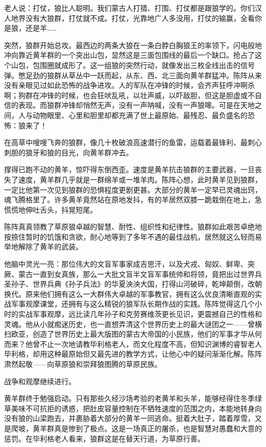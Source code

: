\par 老人说：打仗，狼比人聪明。我们蒙古人打猎、打围、打仗都是跟狼学的。你们汉人地界没有大狼群，打仗就不成。打仗，光靠地广人多没用，打仗的输赢，全看你是狼，还是羊……
\par 突然，狼群开始总攻。最西边的两条大狼在一条白脖白胸狼王的率领下，闪电般地冲向靠近黄羊群的一个突出山包，显然这是三面包围线的最后一个缺口。抢占了这个山包，包围圈就成形了。这一组狼的突然行动，就像发出三枚全线出击的信号弹。憋足劲的狼群从草丛中一跃而起，从东、西、北三面向黄羊群猛冲。陈阵从来没有亲眼见过如此恐怖的战争进攻。人的军队在冲锋的时候，会齐声狂呼冲啊杀啊；狗群在冲锋的时候，也会狂吠乱吼，以壮声威，以吓敌胆，但这是胆虚或不自信的表现。而狼群冲锋却悄然无声，没有一声呐喊，没有一声狼嗥。可是在天地之间，人与动物眼里、心里和胆里却都充满了世上最原始、最残忍、最负盛名的恐怖：狼来了！
\par 在高草中嗖嗖飞奔的狼群，像几十枚破浪高速潜行的鱼雷，运载着最锋利、最刺心刺胆的狼牙和狼的目光，向黄羊群冲去。
\par 撑得已跑不动的黄羊，惊吓得东倒西歪。速度是黄羊抗击狼群的主要武器，一旦丧失了速度，黄羊群几乎就是一群绵羊或一堆羊肉。陈阵心想，此时黄羊见到狼群，一定比他第一次见到狼群的恐惧程度更剧更甚。大部分的黄羊一定早已灵魂出窍，魂飞腾格里了。许多黄羊竟然站在原地发抖，有的羊居然双膝一跪栽倒在地上，急慌慌地伸吐舌头，抖晃短尾。
\par 陈阵真真领教了草原狼卓越的智慧、耐性、组织性和纪律性。狼群如此艰苦卓绝地按捺住暂时的饥饿和贪欲，耐心地等到了多年不遇的最佳战机，居然就这么轻而易举地解除了黄羊的武装。
\par 他脑中灵光一亮：那位伟大的文盲军事家成吉思汗，以及犬戎、匈奴、鲜卑、突厥、蒙古一直到女真族，那么一大批文盲半文盲军事统帅和将领，竟把出过世界兵圣孙子、世界兵典《孙子兵法》的华夏泱泱大国，打得山河破碎，乾坤颠倒，改朝换代。原来他们拥有这么一大群伟大卓越的军事教官，拥有这么优良清晰直观的实战军事观摩课堂，还拥有与这么精锐的狼军队长期作战的实践。陈阵觉得这几个小时的实战军事观摩，远比读几年孙子和克劳赛维茨更长见识，更震撼自己的性格和灵魂。他从小就痴迷历史，也一直想弄清这个世界历史上的最大谜团之一——曾横扫欧亚，创造了世界历史上最大版图的蒙古大帝国的小民族，他们的军事才华从何而来？他曾不止一次地请教毕利格老人，而文化程度不高，但知识渊博的睿智老人毕利格，却用这种最原始但又最先进的教学方式，让他心中的疑问渐渐化解。陈阵肃然起敬——向草原狼和崇拜狼图腾的草原民族。
\par 战争和观摩继续进行。
\par 
\par 黄羊群终于勉强启动。只有那些久经沙场考验的老黄羊和头羊，能够经得住冬季绿草美味不可抗拒的诱惑，把肚皮容量控制在不牺牲速度的范围之内，本能地转身向没有狼的山梁跑去，并裹胁着大部分的黄羊一同逃命。挺着大肚子，踏着厚雪，又是爬坡，黄羊群真是惨到了极点。这是一场真正的屠杀，也是智慧对愚蠢和大意的惩罚。在毕利格老人看来，狼群这是在替天行道，为草原行善。
